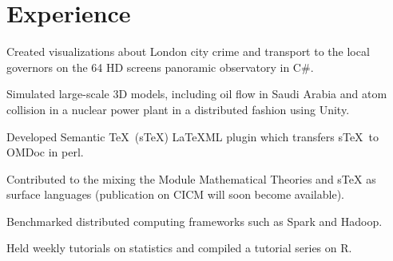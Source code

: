 \documentclass[]{deedy-resume-openfont}
\begin{document}
\hfill
\begin{minipage}[t]{0.66\textwidth} 


\section{Experience}

\vspace{\topsep} %
\begin{tightemize}
\item Created visualizations about London city crime and transport to the local governors on the 64 HD 
screens panoramic observatory in C\#. 
\item Simulated large-scale 3D models, including
oil flow in Saudi Arabia and atom collision in a nuclear power plant in a distributed fashion using Unity. 
\end{tightemize}
\sectionsep

\begin{tightemize}
\item Developed Semantic \TeX \ (sTeX) LaTeXML plugin which transfers 
 s\TeX\ to OMDoc in perl.
 \item Contributed to the mixing the Module Mathematical Theories and sTeX
 as surface languages (publication on CICM will soon become available).
\end{tightemize}

\sectionsep

\begin{tightemize}
\item  Benchmarked distributed computing frameworks such as Spark and Hadoop.
\item Held weekly tutorials on statistics and compiled a tutorial series on R.
\end{tightemize}
\sectionsep


\end{minipage}
\end{document}
